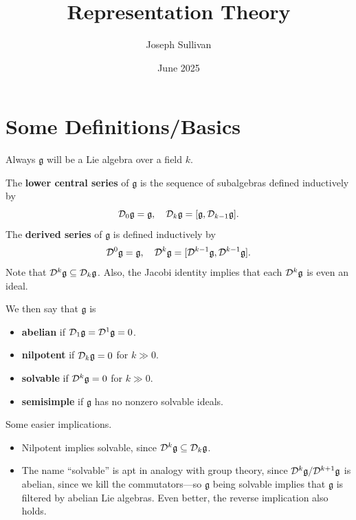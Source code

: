 \documentclass[12pt]{article}
\title{Representation Theory}
\author{Joseph Sullivan}
\date{June 2025}
\newcommand{\fg}{\mathfrak{g}}
\begin{document}
\maketitle
\tableofcontents

\section{Some Definitions/Basics}

Always $\fg$ will be a Lie algebra over a field $k$.

\begin{defn}
    The \textbf{lower central series} of $\fg$ is the sequence of subalgebras defined inductively by
    \[\cD_0 \fg = \fg, \quad \cD_k \fg = [\fg,\cD_{k-1}\fg].\]
    The \textbf{derived series} of $\fg$ is defined inductively by
    \[\cD^0 \fg = \fg, \quad \cD^k \fg = [\cD^{k-1} \fg, \cD^{k-1} \fg].\]
    Note that $\cD^k \fg \subseteq \cD_k \fg$. Also, the Jacobi identity implies that each $\cD^k \fg$ is even an ideal.
\end{defn}

\begin{defn}
    We then say that $\fg$ is
    \begin{itemize}
        \item \textbf{abelian} if $\cD_1 \fg = \cD^1 \fg = 0$.
        \item \textbf{nilpotent} if $\cD_k \fg = 0$ for $k\gg 0$.
        \item \textbf{solvable} if $\cD^k\fg = 0$ for $k\gg 0$.
        \item \textbf{semisimple} if $\fg$ has no nonzero solvable ideals.
    \end{itemize}
\end{defn}

\begin{rmk}
    Some easier implications.
    \begin{itemize}
        \item Nilpotent implies solvable, since $\cD^k \fg \subseteq \cD_k \fg$.
        \item The name ``solvable'' is apt in analogy with group theory, since $\cD^k \fg / \cD^{k+1} \fg$ is abelian, since we kill the commutators---so $\fg$ being solvable implies that $\fg$ is filtered by abelian Lie algebras. Even better, the reverse implication also holds.
    \end{itemize}
\end{rmk}
\end{document}
